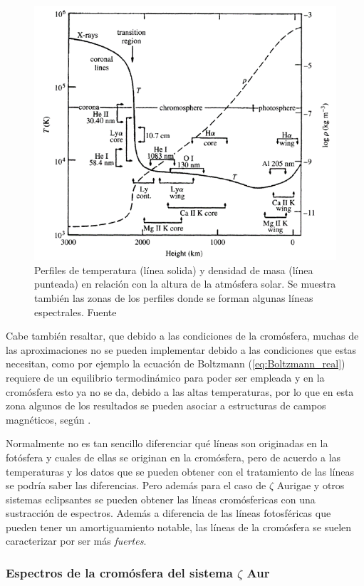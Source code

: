 \documentclass[12pt,oneside,openany,letter]{book}
\begin{document}
\begin{figure}[h]
    \centering
    \includegraphics[width=0.8\linewidth]{Images/perfil_Densidad-temperatura.png}
    \caption{Perfiles de temperatura (línea solida) y densidad de masa (línea punteada) en relación con la altura de la atmósfera solar. Se muestra también las zonas de los perfiles donde se forman algunas líneas espectrales. Fuente \citep{carroll2017introduction}}
    \label{perfil:densidad-temp}
\end{figure}

Cabe también resaltar, que debido a las condiciones de la cromósfera, muchas de las aproximaciones no se pueden implementar debido a las condiciones que estas necesitan, como por ejemplo la ecuación de Boltzmann (\ref{eq:Boltzmann_real}) requiere de un equilibrio termodinámico para poder ser empleada y en la cromósfera esto ya no se da, debido a las altas temperaturas, por lo que en esta zona algunos de los resultados se pueden asociar a estructuras de campos magnéticos, según \citep{zhang2020magnetic}.

Normalmente no es tan sencillo diferenciar qué líneas son originadas en la fotósfera y cuales de ellas se originan en la cromósfera, pero de acuerdo a las temperaturas y los datos que se pueden obtener con el tratamiento de las líneas se podría saber las diferencias. Pero además para el caso de $\zeta$ Aurigae y otros sistemas eclipsantes se pueden obtener las líneas cromósfericas con una sustracción de espectros. Además a diferencia de las líneas fotosféricas que pueden tener un amortiguamiento notable, las líneas de la cromósfera se suelen caracterizar por ser más \textit{fuertes}.


\subsubsection{Espectros de la cromósfera del  sistema $\zeta$ Aur}
\end{document}

